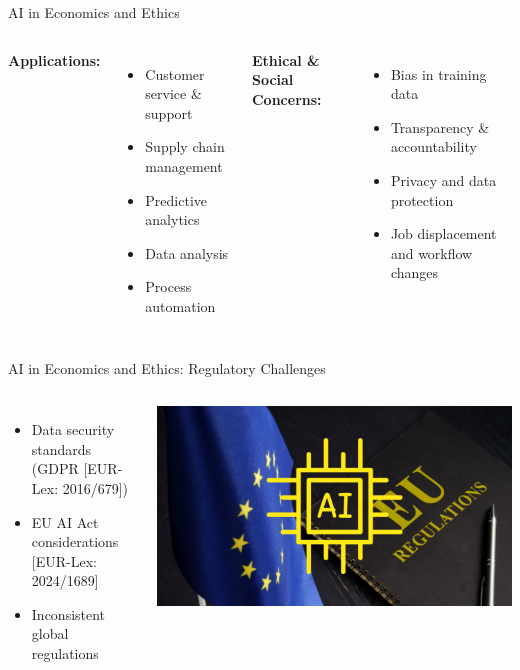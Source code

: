 \documentclass{beamer}
\begin{document}
\begin{frame}{AI in Economics and Ethics}
  \begin{columns}
      \textbf{Applications:}
      \begin{itemize}
        \item Customer service \& support
        \item Supply chain management
        \item Predictive analytics
        \item Data analysis
        \item Process automation
      \end{itemize}
      \textbf{Ethical \& Social Concerns:}
      \begin{itemize}
        \item Bias in training data
        \item Transparency \& accountability
        \item Privacy and data protection
        \item Job displacement and workflow changes
      \end{itemize}
  \end{columns}
\end{frame}
\begin{frame}{AI in Economics and Ethics: Regulatory Challenges}
    \begin{columns}
            \begin{itemize}
                \item Data security standards \\(GDPR [EUR-Lex: 2016/679])
                \item EU AI Act considerations [EUR-Lex: 2024/1689]
                \item Inconsistent global regulations
            \end{itemize}
            \centering
            \includegraphics[width=\textwidth]{EU-AI-Regulation.png} %
    \end{columns}
\end{frame}
\end{document}
